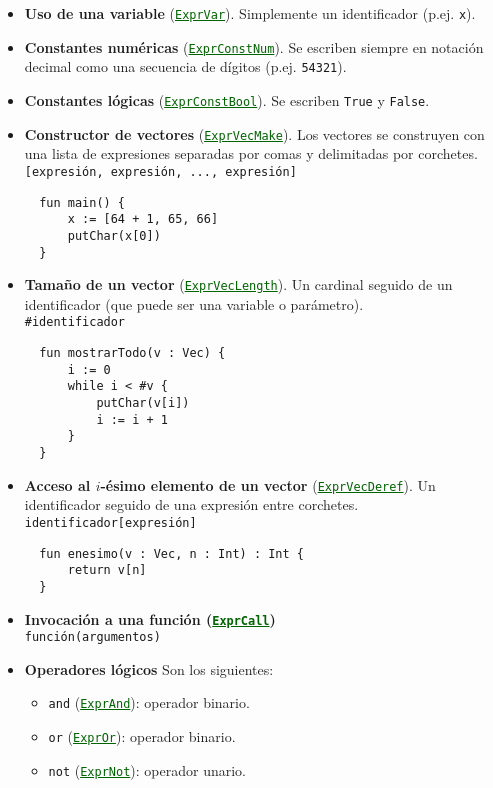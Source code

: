 \documentclass{article}
\renewcommand{\ast}[1]{\textcolor{darkgreen}{\texttt{\underline{#1}}}}
\begin{document}
\begin{itemize}
\item
  {\bf Uso de una variable} (\ast{ExprVar}).
  Simplemente un identificador (p.ej. \texttt{x}).
\item
  {\bf Constantes num\'ericas} (\ast{ExprConstNum}).
  Se escriben siempre en notaci\'on decimal como 
  una secuencia de d\'igitos (p.ej. \texttt{54321}).
\item
  {\bf Constantes l\'ogicas} (\ast{ExprConstBool}).
  Se escriben \texttt{True} y \texttt{False}.
\item
  {\bf Constructor de vectores} (\ast{ExprVecMake}).
  Los vectores se construyen con una lista de expresiones
  separadas por comas y delimitadas por corchetes.\\
  \texttt{[expresi\'on, expresi\'on, ..., expresi\'on]}
  \begin{lstlisting}
  fun main() {
      x := [64 + 1, 65, 66]
      putChar(x[0])
  }
  \end{lstlisting}
\item
  {\bf Tama\~no de un vector} (\ast{ExprVecLength}).
  Un cardinal seguido de un identificador (que puede ser una
  variable o par\'ametro).\\
  \texttt{\#identificador}
  \begin{lstlisting}
  fun mostrarTodo(v : Vec) {
      i := 0
      while i < #v { 
          putChar(v[i])
          i := i + 1
      }
  }
  \end{lstlisting}
\item
  {\bf Acceso al $i$-\'esimo elemento de un vector} (\ast{ExprVecDeref}).
  Un identificador seguido de una expresi\'on entre corchetes.\\
  \texttt{identificador[expresi\'on]}
  \begin{lstlisting}
  fun enesimo(v : Vec, n : Int) : Int {
      return v[n]
  }
  \end{lstlisting}
\item {\bf Invocaci\'on a una funci\'on (\ast{ExprCall})}\\
  \texttt{funci\'on(argumentos)}
\item {\bf Operadores l\'ogicos}
  Son los siguientes:
  \begin{itemize}
  \item \texttt{and} (\ast{ExprAnd}): operador binario.
  \item \texttt{or}  (\ast{ExprOr}): operador binario.
  \item \texttt{not} (\ast{ExprNot}): operador unario.
  \end{itemize}

\end{itemize}
\end{document}
